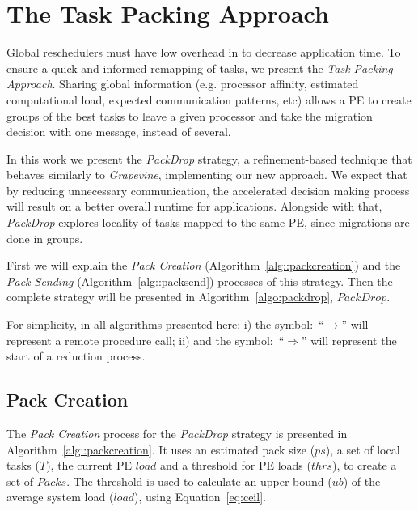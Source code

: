 \section{The Task Packing Approach}

Global reschedulers must have low overhead in to decrease application time. %
To ensure a quick and informed remapping of tasks, we present the \textit{Task Packing Approach}.
Sharing global information (e.g. processor affinity, estimated computational load, expected communication patterns, etc) allows a PE to create groups of the best tasks to leave a given processor and take the migration decision with one message, instead of several.

In this work we present the \textit{PackDrop} strategy, a refinement-based technique that behaves similarly to \textit{Grapevine}, implementing our new approach. %
We expect that by reducing unnecessary communication, the accelerated decision making process will result on a better overall runtime for applications.
Alongside with that, \textit{PackDrop} explores locality of tasks mapped to the same PE, since migrations are done in groups. %

First we will explain the \textit{Pack Creation} (Algorithm~\ref{alg::packcreation}) and the \textit{Pack Sending} (Algorithm~\ref{alg::packsend}) processes of this strategy.
Then the complete strategy will be presented in Algorithm~\ref{algo:packdrop}, $PackDrop$.

For simplicity, in all algorithms presented here: i) the symbol:~``$\rightarrow$'' will represent a remote procedure call; ii) and the symbol:~``$\Rightarrow$'' will  represent the start of a reduction process.

\subsection{Pack Creation}

The \textit{Pack Creation} process for the \textit{PackDrop} strategy is presented in Algorithm~\ref{alg::packcreation}.
It uses an estimated pack size ($ps$), a set of local tasks ($T$), the current PE $load$ and a threshold for PE loads ($thrs$), to create a set of $Packs$.
The threshold is used to calculate an upper bound ($ub$) of the average system load ($\overline{load}$), using Equation~\ref{eq:ceil}. 

